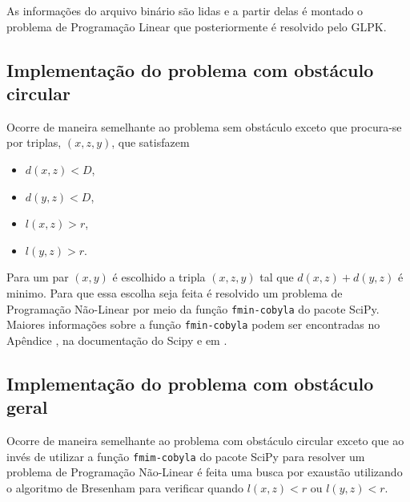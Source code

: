 As informações do arquivo binário são lidas e a partir delas é montado o
problema de Programação Linear que posteriormente é resolvido pelo GLPK.

\subsection{Implementação do problema com obstáculo circular}
Ocorre de maneira semelhante ao problema sem obstáculo exceto que procura-se
por triplas, $(x, z, y)$, que satisfazem 
\begin{itemize}
    \item $d(x, z) < D$,
    \item $d(y, z) < D$,
    \item $l(x, z) > r$,
    \item $l(y, z) > r$.
\end{itemize}

Para um par $(x, y)$ é escolhido a tripla $(x, z, y)$ tal que $d(x, z) + d(y,
z)$ é minimo. Para que essa escolha seja feita é resolvido um problema de
Programação Não-Linear por meio da função \texttt{fmin-cobyla} do pacote SciPy.
Maiores
informações sobre a função \texttt{fmin-cobyla} podem ser encontradas no
Apêndice , na documentação do Scipy e em \cite{Powell:2007}.

\subsection{Implementação do problema com obstáculo geral}
Ocorre de maneira semelhante ao problema com obstáculo circular exceto que ao
invés de utilizar a função \texttt{fmim-cobyla} do pacote SciPy para resolver
um problema de Programação Não-Linear é feita uma busca por exaustão utilizando
o algoritmo de Bresenham para verificar quando $l(x, z) < r$ ou $l(y, z) < r$.
